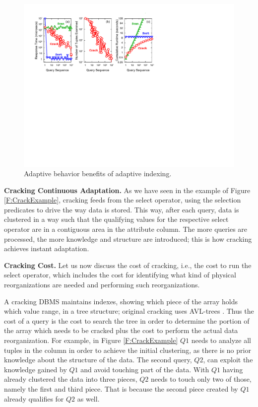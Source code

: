 \begin{figure}[t]
\hspace{-1em}
\includegraphics[width=1.05\columnwidth]{graphs/figure2.pdf}%
\vspace{-1em}
\caption{Adaptive behavior benefits of adaptive indexing.}
\vspace{-2em}
\label{F:BasicPerQuery}
\end{figure}

\textbf{Cracking Continuous Adaptation.}
As we have seen in the example of Figure \ref{F:CrackExample},
cracking feeds from the select operator, using the selection predicates to drive the way data is stored.
This way, after each query, data is clustered in a way such that the qualifying values for the
respective select operator are in a contiguous area in the attribute column. 
The more queries are processed, the more knowledge and structure
are introduced; this is how cracking achieves instant adaptation.



\textbf{Cracking Cost.}
Let us now discuss the cost of cracking, i.e., the cost to run the select operator, which includes the cost
for identifying what kind of physical reorganizations are needed and performing such reorganizations.

A cracking DBMS maintains indexes, showing which piece of the array holds which value range,
in a tree structure; original cracking uses AVL-trees \cite{IKM:CIDR07}.
Thus the cost of a query is the cost to search the tree in order to determine
the portion of the array which needs to be cracked plus the cost to perform the actual data reorganization.
For example, in Figure \ref{F:CrackExample} $Q1$ needs to analyze all tuples in the column
in order to achieve the initial clustering, as there is no prior knowledge about the structure of the data.
The second query, $Q2$, can exploit the knowledge gained by $Q1$ and avoid touching part of the data.
With $Q1$ having already clustered the data into three pieces, $Q2$ needs to touch only
two of those, namely the first and third piece. That is because the second piece created by $Q1$
already qualifies for $Q2$ as well.

